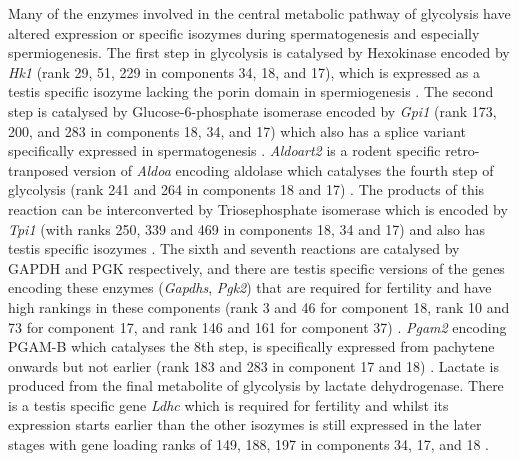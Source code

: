 Many of the enzymes involved in the central metabolic pathway of glycolysis have altered expression or specific isozymes during spermatogenesis and especially spermiogenesis.
The first step in glycolysis is catalysed by Hexokinase encoded by \textit{Hk1} (rank 29, 51, 229 in components 34, 18, and 17), which is expressed as a testis specific isozyme lacking the porin domain in spermiogenesis \parencite{Mori1993Unique,Nakamura2008Spermatogenic}.
The second step is catalysed by Glucose-6-phosphate isomerase encoded by \textit{Gpi1} (rank 173, 200, and 283 in components 18, 34, and 17) which also has a splice variant specifically expressed in spermatogenesis \parencite{Buehr1981electrophoretically, Vemuganti2010Frequent}.
\textit{Aldoart2} is a rodent specific retro-tranposed version of \textit{Aldoa} encoding aldolase which catalyses the fourth step of glycolysis (rank 241 and 264 in components 18 and 17) \parencite{Vemuganti2007Three, Vemuganti2010Frequent}.
The products of this reaction can be interconverted by Triosephosphate isomerase which is encoded by \textit{Tpi1} (with ranks 250, 339 and 469 in components 18, 34 and 17) and also has testis specific isozymes \parencite{Ijiri2013Male}.
The sixth and seventh reactions are catalysed by GAPDH and PGK respectively, and there are testis specific versions of the genes encoding these enzymes (\textit{Gapdhs}, \textit{Pgk2}) that are required for fertility and have high rankings in these components (rank 3 and 46 for component 18, rank 10 and 73 for component 17, and rank 146 and 161 for component 37) \parencite{McCarrey1987Human,Welch1992Expression, Miki2004Glyceraldehyde, Danshina2010Phosphoglycerate}.
\textit{Pgam2} encoding PGAM-B which catalyses the 8th step, is specifically expressed from pachytene onwards but not earlier (rank 183 and 283 in component 17 and 18) \parencite{Fundele1987Developmental}.
Lactate is produced from the final metabolite of glycolysis by lactate dehydrogenase.
There is a testis specific gene \textit{Ldhc} which is required for fertility and whilst its expression starts earlier than the other isozymes is still expressed in the later stages with gene loading ranks of 149, 188, 197 in components 34, 17, and 18 \parencite{Sakai1987Molecular, Odet2008Expression}.


